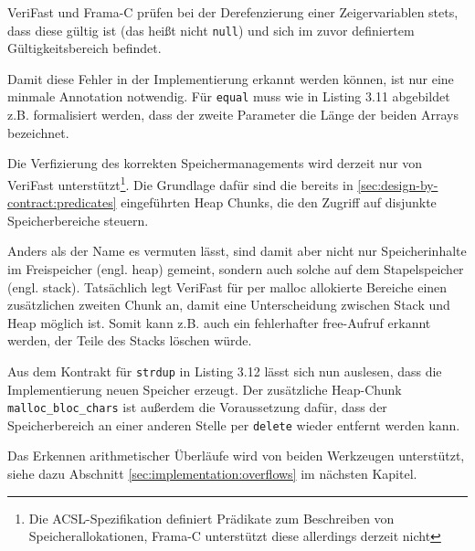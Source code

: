 VeriFast und Frama-C prüfen bei der Derefenzierung einer Zeigervariablen stets, dass diese gültig ist (das heißt
nicht \texttt{null}) und sich im zuvor definiertem Gültigkeitsbereich befindet. 

Damit diese Fehler in der Implementierung erkannt werden können, ist nur eine minmale Annotation notwendig. 
Für \texttt{equal} muss wie in Listing 3.11 abgebildet z.B. formalisiert werden, dass der zweite Parameter die 
Länge der beiden Arrays bezeichnet. 



Die Verfizierung des korrekten Speichermanagements wird derzeit nur von VeriFast unterstützt\footnote{Die ACSL-Spezifikation
definiert Prädikate zum Beschreiben von Speicherallokationen, Frama-C unterstützt diese allerdings derzeit nicht}. Die Grundlage dafür
sind die bereits in \ref{sec:design-by-contract:predicates} eingeführten Heap Chunks, die den Zugriff auf disjunkte 
Speicherbereiche steuern.

Anders als der Name es vermuten lässt, sind damit aber nicht nur Speicherinhalte im Freispeicher (engl. heap) gemeint, 
sondern auch solche auf dem Stapelspeicher (engl. stack). Tatsächlich legt VeriFast für
per malloc allokierte Bereiche einen zusätzlichen zweiten Chunk an, damit eine Unterscheidung zwischen Stack und
Heap möglich ist. Somit kann z.B. auch ein fehlerhafter free-Aufruf erkannt werden, der Teile des Stacks löschen würde.


Aus dem Kontrakt für \texttt{strdup} in Listing 3.12 lässt sich nun auslesen, dass die Implementierung neuen Speicher
erzeugt. Der zusätzliche Heap-Chunk \lstinline{malloc_bloc_chars} ist außerdem die Voraussetzung dafür, dass der Speicherbereich
an einer anderen Stelle per \texttt{delete} wieder entfernt werden kann.

Das Erkennen arithmetischer Überläufe wird von beiden Werkzeugen unterstützt, siehe dazu Abschnitt \ref{sec:implementation:overflows}
im nächsten Kapitel.



